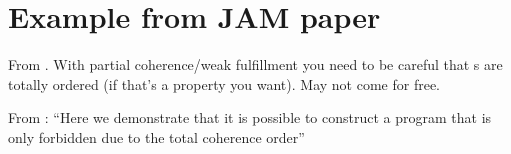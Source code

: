 \begin{comment}
  \centering  
\begin{verbatim}
Y := 0                   Y := 1                 
a := Y                   d := CAS(X,0,1) /37?   
if a != 0 then           if d != 42 then        
  b := CAS(X,0,42)         L := 1               
  if b = 0 then
    c := L
    if c = 1 then
      Xsrlx := 37
\end{verbatim}
\texttt{[image: LDRF-PF-Fail.png]}
\caption{LDRF-PF-Fail}
\end{comment}


\section{Example from JAM paper}
From \cite[]{DBLP:journals/pacmpl/BenderP19}.  With partial
coherence/weak fulfillment you need to be careful that \RMW{}s are totally
ordered (if that's a property you want).  May not come for free.

 From \cite[\textsection B]{DBLP:journals/pacmpl/BenderP19}:
``Here we demonstrate that it is possible to construct a program that is only
forbidden due to the total coherence order''

\begin{comment}
AArch64 TotalCO
{
0:X1=x; 0:X3=y; 
1:X1=x; 1:X3=y;
2:X1=x; 2:X3=y;
}
 P0            | P1           | P2;
 LDR X2,[X1]   | LDAR X5, [X3]| LDAR X5,[X1];
 MOV X0,#1     | MOV X2,#2    | MOV X0, #1;
 STR X0,[X1]   | STR X2,[X1]  | STR X0, [X3];

exists (0:X2=2 /\ 1:X5=1 /\ 2:X5=1)
\end{comment}


